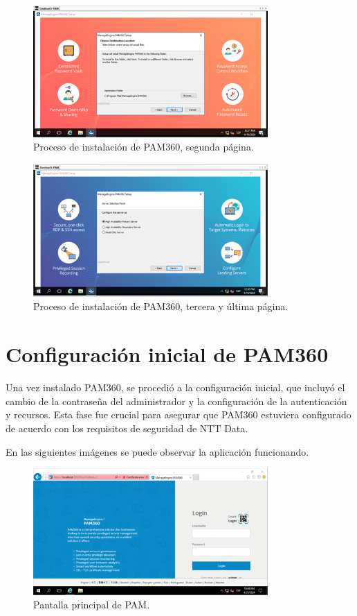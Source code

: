 \begin{figure}[H]
	\centering
	\includegraphics[width=0.8\textwidth]{./img/instalacion_pam3.png}
	\caption{Proceso de instalación de PAM360, segunda página.}
	\label{fig:instalacion_detalle2}
\end{figure}

\begin{figure}[H]
	\centering
	\includegraphics[width=0.8\textwidth]{./img/instalacion_pam4.png}
	\caption{Proceso de instalación de PAM360, tercera y última página.}
	\label{fig:instalacion_detalle3}
\end{figure}

\section{Configuración inicial de PAM360}
Una vez instalado PAM360, se procedió a la configuración inicial, que incluyó el cambio de la contraseña del administrador y la configuración de la autenticación y recursos. Esta fase fue crucial para asegurar que PAM360 estuviera configurado de acuerdo con los requisitos de seguridad de NTT Data.

En las siguientes imágenes se puede observar la aplicación funcionando. 
\begin{figure}[H]
	\centering
	\includegraphics[width=0.8\textwidth]{./img/login_pam_limpio.png}
	\caption{Pantalla principal de PAM.}
	\label{fig:pam_accesoinicial}
\end{figure}


